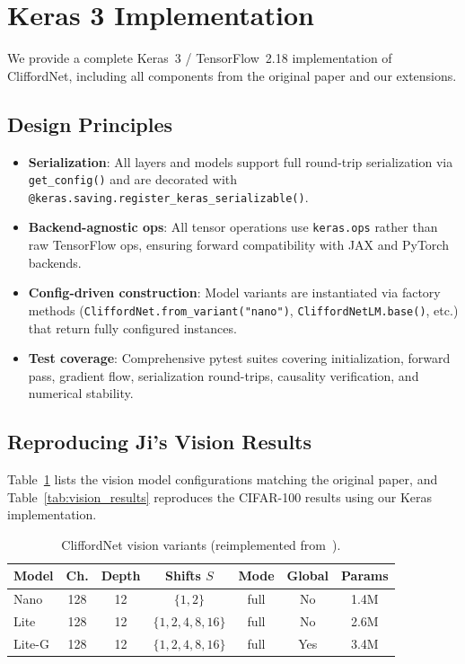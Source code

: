 \documentclass{article}
\begin{document}
\section{Keras 3 Implementation}
\label{sec:implementation}

We provide a complete Keras~3 / TensorFlow~2.18 implementation of CliffordNet, including all components from the original paper and our extensions.

\subsection{Design Principles}

\begin{itemize}
  \item \textbf{Serialization}: All layers and models support full round-trip serialization via \texttt{get\_config()} and are decorated with \texttt{@keras.saving.register\_keras\_serializable()}.
  \item \textbf{Backend-agnostic ops}: All tensor operations use \texttt{keras.ops} rather than raw TensorFlow ops, ensuring forward compatibility with JAX and PyTorch backends.
  \item \textbf{Config-driven construction}: Model variants are instantiated via factory methods (\texttt{CliffordNet.from\_variant("nano")}, \texttt{CliffordNetLM.base()}, etc.) that return fully configured instances.
  \item \textbf{Test coverage}: Comprehensive pytest suites covering initialization, forward pass, gradient flow, serialization round-trips, causality verification, and numerical stability.
\end{itemize}

\subsection{Reproducing Ji's Vision Results}

Table~\ref{tab:vision_variants} lists the vision model configurations matching the original paper, and Table~\ref{tab:vision_results} reproduces the CIFAR-100 results using our Keras implementation.

\begin{table}[t]
\centering
\caption{CliffordNet vision variants (reimplemented from~\citet{ji2026cliffordnet}).}
\label{tab:vision_variants}
\begin{tabular}{lcccccc}
\toprule
\textbf{Model} & \textbf{Ch.} & \textbf{Depth} & \textbf{Shifts $S$} & \textbf{Mode} & \textbf{Global} & \textbf{Params} \\
\midrule
Nano      & 128 & 12 & $\{1, 2\}$           & full  & No  & 1.4M  \\
Lite      & 128 & 12 & $\{1, 2, 4, 8, 16\}$ & full  & No  & 2.6M  \\
Lite-G    & 128 & 12 & $\{1, 2, 4, 8, 16\}$ & full  & Yes & 3.4M  \\
\bottomrule
\end{tabular}
\end{table}
\end{document}
